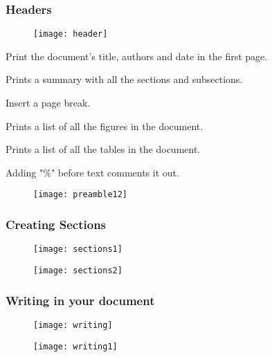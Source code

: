 \documentclass{beamer}
\begin{document}
\begin{frame}[fragile]
	\frametitle{Headers}
	\begin{figure}
		\centering
		\texttt{[image: header]}
	\end{figure}
	\begin{multicols}{2}
		[]
	\begin{description}
		\tiny
		\item[maketitle] Print the document's title, authors and date in the first page.
		\item[tableofcontents] Prints a summary with all the sections and subsections.
		\item[newpage] Insert a page break.
		\item[listoffigures] Prints a list of all the figures in the document.
		\item[listoftables] Prints a list of all the tables in the document.\
		\item[Comments] Adding "\%" before text comments it out.
	\end{description}
	\columnbreak
	\begin{figure}
		\centering
		\texttt{[image: preamble12]}
	\end{figure}
	
	\end{multicols}
	
\end{frame}
\begin{frame}[fragile]
	\frametitle{Creating Sections}
	\begin{figure}
		\texttt{[image: sections1]}
	\end{figure}
 \begin{figure}
 	\centering
 	\texttt{[image: sections2]}
 \end{figure}
\end{frame}

\begin{frame}[fragile]
	\frametitle{Writing in your document}
	\begin{figure}
		\centering
		\texttt{[image: writing]}
	\end{figure}
\begin{figure}
	\centering
	\texttt{[image: writing1]}
\end{figure}
\end{frame}
\end{document}
